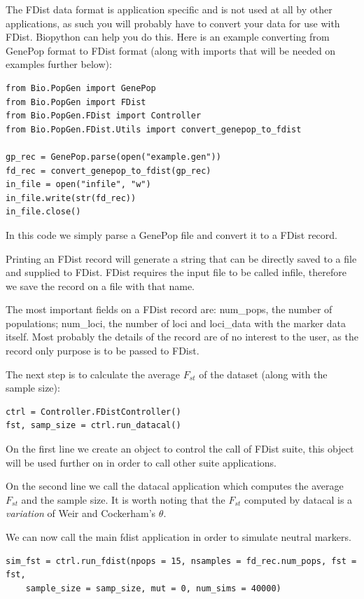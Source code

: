 \documentclass{report}
\begin{document}
The FDist data format is application specific and is not used at
all by other applications, as such you will probably have to convert
your data for use with FDist. Biopython can help you do this.
Here is an example converting from GenePop format to FDist format
(along with imports that will be needed on examples further below):

\begin{verbatim}
from Bio.PopGen import GenePop
from Bio.PopGen import FDist
from Bio.PopGen.FDist import Controller
from Bio.PopGen.FDist.Utils import convert_genepop_to_fdist

gp_rec = GenePop.parse(open("example.gen"))
fd_rec = convert_genepop_to_fdist(gp_rec)
in_file = open("infile", "w")
in_file.write(str(fd_rec))
in_file.close()
\end{verbatim}

In this code we simply parse a GenePop file and convert it to a FDist
record.

Printing an FDist record will generate
a string that can be directly saved to a file and supplied to FDist. FDist
requires the input file to be called infile, therefore we save the record on
a file with that name.

The most important fields on a FDist record are: num\_pops, the number of
populations; num\_loci, the number of loci and loci\_data with the marker
data itself. Most probably the details of the record are of no interest
to the user, as the record only purpose is to be passed to FDist.

The next step is to calculate the average $F_{st}$ of the dataset (along
with the sample size):

\begin{verbatim}
ctrl = Controller.FDistController()
fst, samp_size = ctrl.run_datacal()
\end{verbatim}

On the first line we create an object to control the call of  FDist
suite, this object will be used further on in order to call other
suite applications.

On the second line we call the datacal application which computes the
average $F_{st}$
and the sample size. It is worth noting that the $F_{st}$ computed by
datacal is a \emph{variation} of Weir and Cockerham's $\theta$.

We can now call the main fdist application in order to simulate neutral
markers.

\begin{verbatim}
sim_fst = ctrl.run_fdist(npops = 15, nsamples = fd_rec.num_pops, fst = fst,
    sample_size = samp_size, mut = 0, num_sims = 40000)
\end{verbatim}
\end{document}
